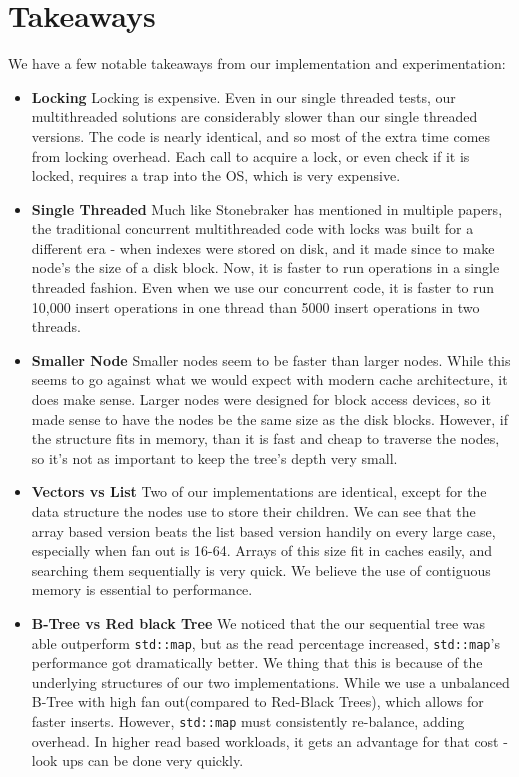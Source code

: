 \documentclass{sig-alternate}
\begin{document}
\section{Takeaways}
We have a few notable takeaways from our implementation and experimentation:
\begin{itemize}
\item \textbf{Locking} Locking is expensive.  Even in our single threaded tests, our multithreaded solutions are considerably slower than our single threaded versions.  The code is nearly identical, and so most of the extra time comes from locking overhead.  Each call to acquire a lock, or even check if it is locked, requires a trap into the OS, which is very expensive.

\item \textbf{Single Threaded} Much like Stonebraker has mentioned in multiple papers, the traditional concurrent multithreaded code with locks was built for a different era - when indexes were stored on disk, and it made since to make node's the size of a disk block.  Now, it is faster to run operations in a single threaded fashion.  Even when we use our concurrent code, it is faster to run 10,000 insert operations in one thread than 5000 insert operations in two threads.

\item \textbf{Smaller Node} Smaller nodes seem to be faster than larger nodes.  While this seems to go against what we would expect with modern cache architecture, it does make sense.  Larger nodes were designed for block access devices, so it made sense to have the nodes be the same size as the disk blocks.  However, if the structure fits in memory, than it is fast and cheap to traverse the nodes, so it's not as important to keep the tree's depth very small.

\item \textbf{Vectors vs List} Two of our implementations are identical, except for the data structure the nodes use to store their children.  We can see that the array based version beats the list based version handily on every large case, especially when fan out is 16-64.  Arrays of this size fit in caches easily, and searching them sequentially is very quick.  We believe the use of contiguous memory is essential to performance.

\item \textbf{B-Tree vs Red black Tree} We noticed that the our sequential tree was able outperform \texttt{std::map}, but as the read percentage increased, \texttt{std::map}'s performance got dramatically better.  We thing that this is because of the underlying structures of our two implementations.  While we use a unbalanced B-Tree with high fan out(compared to Red-Black Trees), which allows for faster inserts.  However, \texttt{std::map} must consistently re-balance, adding overhead.  In higher read based workloads, it gets an advantage for that cost - look ups can be done very quickly.

\end{itemize}
\end{document}
